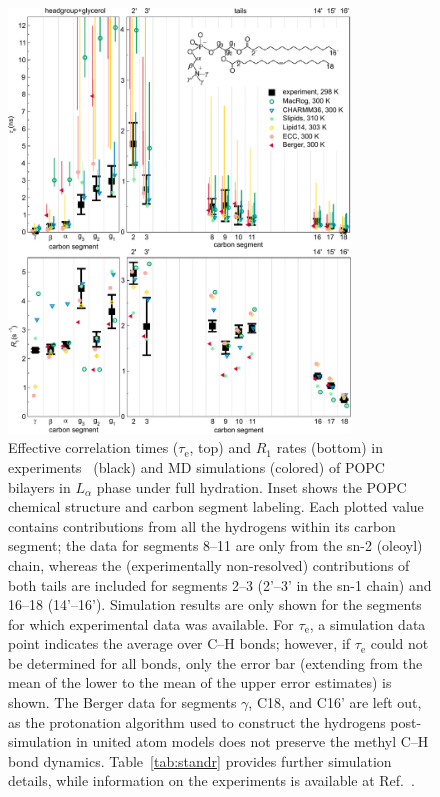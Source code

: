 \documentclass[journal=jcisd8,manuscript=article,layout=twocolumn]{achemso}
\begin{document}
\begin{figure}[!h]
\centering
\includegraphics[width=0.81\textwidth]{../Figs/normalcond5.pdf}
\caption{Effective correlation times ($\tau_\mathrm{e}$, top) and $R_{1}$ rates (bottom) in experiments~\cite{Antila:2020a} (black) and MD simulations (colored) of POPC bilayers in $L_{\alpha}$ phase under full hydration.
Inset shows the POPC chemical structure and carbon segment labeling.
Each plotted value contains contributions from all the hydrogens within its carbon segment; the data for segments 8--11 are only from the sn-2 (oleoyl) chain, whereas the (experimentally non-resolved) contributions of both tails are included for segments 2--3 (2'--3' in the sn-1 chain) and 16--18 (14'--16').
%
Simulation results are only shown for the segments for which experimental data was available.
%
For $\tau_\mathrm{e}$,
a simulation data point indicates the average over C--H bonds; however,
if $\tau_\mathrm{e}$ could not be determined for all bonds, only the error bar
(extending from the mean of the lower to the mean of the upper error estimates) is shown.
%
The Berger data for segments $\gamma$, C18, and C16' are left out, as the protonation algorithm used to construct the hydrogens post-simulation in united atom models does not preserve the methyl C--H bond dynamics.
%
Table~\ref{tab:standr} provides further simulation details, while information on the experiments is available at Ref.~.
}
\label{fig:teff_R1}

\end{figure}
\end{document}
